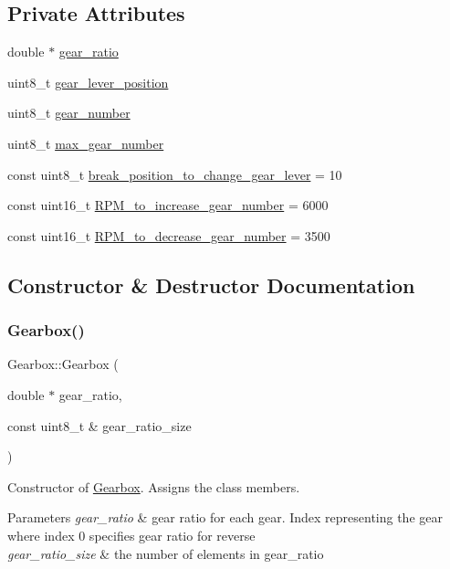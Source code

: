 \subsection*{Private Attributes}
\begin{DoxyCompactItemize}
\item 
double $\ast$ \hyperlink{classGearbox_abb63a875027a74947b345a080f012042}{gear\+\_\+ratio}
\item 
uint8\+\_\+t \hyperlink{classGearbox_a1fb7a1973d59b2af8bfd43138c10a087}{gear\+\_\+lever\+\_\+position}
\item 
uint8\+\_\+t \hyperlink{classGearbox_a124962b15e4138b6d5cabbd47e3a85ec}{gear\+\_\+number}
\item 
uint8\+\_\+t \hyperlink{classGearbox_abe090c962b87301623d90d15cf61714c}{max\+\_\+gear\+\_\+number}
\item 
const uint8\+\_\+t \hyperlink{classGearbox_a3b7708c5a08bc9758a5317e59dbea5c9}{break\+\_\+position\+\_\+to\+\_\+change\+\_\+gear\+\_\+lever} = 10
\item 
const uint16\+\_\+t \hyperlink{classGearbox_a7730abcaf967e6b3709ae41bd1827c14}{R\+P\+M\+\_\+to\+\_\+increase\+\_\+gear\+\_\+number} = 6000
\item 
const uint16\+\_\+t \hyperlink{classGearbox_a4c111dfacfef644a60497c22d0b003d5}{R\+P\+M\+\_\+to\+\_\+decrease\+\_\+gear\+\_\+number} = 3500
\end{DoxyCompactItemize}


\subsection{Constructor \& Destructor Documentation}
\mbox{\label{classGearbox_ad69644f532bef91882a7ee5142072db9}} 
\subsubsection{\texorpdfstring{Gearbox()}{Gearbox()}}
{\footnotesize\ttfamily Gearbox\+::\+Gearbox (\begin{DoxyParamCaption}\item[{double $\ast$}]{gear\+\_\+ratio,  }\item[{const uint8\+\_\+t \&}]{gear\+\_\+ratio\+\_\+size }\end{DoxyParamCaption})}

Constructor of \hyperlink{classGearbox}{Gearbox}. Assigns the class members. 
\begin{DoxyParams}{Parameters}
{\em gear\+\_\+ratio} & gear ratio for each gear. Index representing the gear where index 0 specifies gear ratio for reverse \\
\hline
{\em gear\+\_\+ratio\+\_\+size} & the number of elements in gear\+\_\+ratio \\
\hline
\end{DoxyParams}
\mbox{\label{classGearbox_a61e8c826de0c32d2acdfca6710209b11}} 
